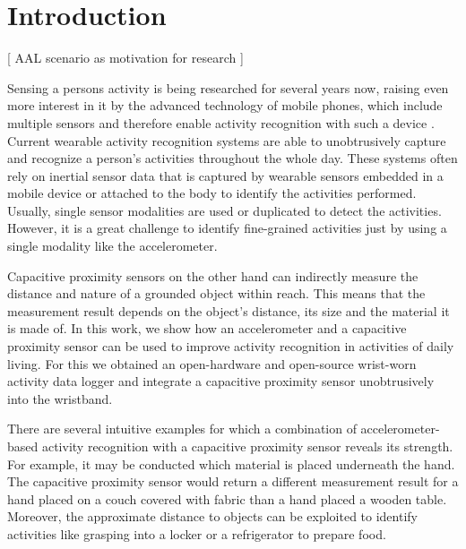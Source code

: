 \documentclass[runningheads,a4paper]{llncs}
\begin{document}
\section{Introduction}

[ AAL scenario as motivation for research ]

Sensing a persons activity is being researched for several years now, raising even more interest in it by the advanced technology of mobile phones, which include multiple sensors and therefore enable activity recognition with such a device \cite{brezmes2009activity}. Current wearable activity recognition systems are able to unobtrusively capture and recognize a person's activities throughout the whole day. These systems often rely on inertial sensor data that is captured by wearable sensors embedded in a mobile device \cite{brezmes2009activity} or attached to the body \cite{Ravi2005} to identify the activities performed. Usually, single sensor modalities are used or duplicated to detect the activities. However, it is a great challenge to identify fine-grained activities just by using a single modality like the accelerometer.

Capacitive proximity sensors on the other hand can indirectly measure the distance and nature of a grounded object within reach. This means that the measurement result depends on the object's distance, its size and the material it is made of. In this work, we show how an accelerometer and a capacitive proximity sensor can be used to improve activity recognition in activities of daily living.
For this we obtained an open-hardware and open-source wrist-worn activity data logger \cite{hedgehog} and integrate a capacitive proximity sensor unobtrusively into the wristband.

There are several intuitive examples for which a combination of accelerometer-based activity recognition with a capacitive proximity sensor reveals its strength. For example, it may be conducted which material is placed underneath the hand. The capacitive proximity sensor would return a different measurement result for a hand placed on a couch covered with fabric than a hand placed a wooden table. Moreover, the approximate distance to objects can be exploited to identify activities like grasping into a locker or a refrigerator to prepare food.
\end{document}
